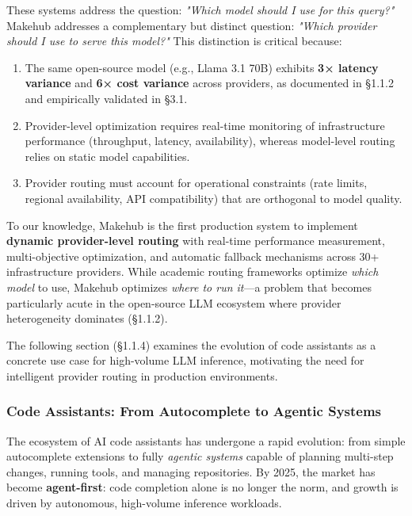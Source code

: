 \documentclass[english]{article}
\begin{document}
These systems address the question: \emph{"Which model should I use for this query?"} Makehub addresses a complementary but distinct question: \emph{"Which provider should I use to serve this model?"} This distinction is critical because:

\begin{enumerate}
    \item The same open-source model (e.g., Llama 3.1 70B) exhibits \textbf{3× latency variance} and \textbf{6× cost variance} across providers, as documented in §1.1.2 and empirically validated in §3.1.
    \item Provider-level optimization requires real-time monitoring of infrastructure performance (throughput, latency, availability), whereas model-level routing relies on static model capabilities.
    \item Provider routing must account for operational constraints (rate limits, regional availability, API compatibility) that are orthogonal to model quality.
\end{enumerate}

To our knowledge, Makehub is the first production system to implement \textbf{dynamic provider-level routing} with real-time performance measurement, multi-objective optimization, and automatic fallback mechanisms across 30+ infrastructure providers. While academic routing frameworks optimize \emph{which model} to use, Makehub optimizes \emph{where to run it}—a problem that becomes particularly acute in the open-source LLM ecosystem where provider heterogeneity dominates (§1.1.2).

The following section (§1.1.4) examines the evolution of code assistants as a concrete use case for high-volume LLM inference, motivating the need for intelligent provider routing in production environments.





\subsubsection{Code Assistants: From Autocomplete to Agentic Systems}

The ecosystem of AI code assistants has undergone a rapid evolution: from simple autocomplete extensions to fully \emph{agentic systems} capable of planning multi-step changes, running tools, and managing repositories. By 2025, the market has become \textbf{agent-first}: code completion alone is no longer the norm, and growth is driven by autonomous, high-volume inference workloads.
\end{document}
